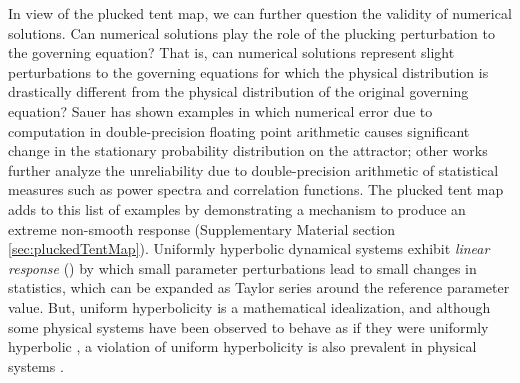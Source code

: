 \documentclass[preprint,12pt]{elsarticle}
\begin{document}
In view of the plucked tent map, we can further question the
validity of numerical solutions. Can numerical solutions play 
the role of the plucking perturbation to the 
governing equation? That is, can numerical solutions represent 
slight perturbations to the governing equations for which the physical 
distribution is drastically different from the physical distribution 
of the original governing equation? Sauer \cite{sauer} has shown 
examples in which numerical error due to computation in double-precision floating point arithmetic causes significant change in the stationary probability distribution on the attractor; other works \cite{cns} further analyze the unreliability due to double-precision arithmetic of statistical measures such as power spectra and correlation functions. The plucked tent map adds to this list of examples by demonstrating a mechanism to produce an extreme non-smooth response (Supplementary Material section \ref{sec:pluckedTentMap}). Uniformly hyperbolic 
dynamical systems exhibit \emph{linear response} 
(\cite{ruelle}\cite{baladi}) by which small parameter perturbations 
lead to small changes in statistics, which can be expanded as Taylor series around the reference parameter value. But, uniform hyperbolicity is a mathematical idealization, and although some physical systems have been observed to behave as if they were uniformly hyperbolic \cite{gallavotti}, a violation of uniform hyperbolicity is also prevalent in physical systems
\cite{wormell}\cite{lucarini}. 
\end{document}

